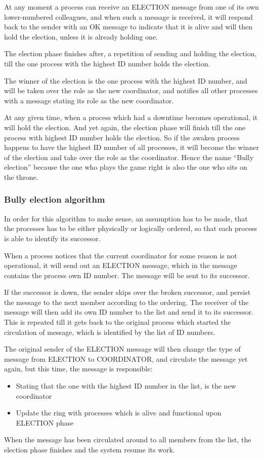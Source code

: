 At any moment a process can receive an ELECTION message from one of its own lower-numbered colleagues, and when such a message is received, it will respond back to the sender with an OK message to indicate that it is alive and will then hold the election, unless it is already holding one.

The election phase finishes after, a repetition of sending and holding the election, till the one process with the highest ID number holds the election.

The winner of the election is the one process with the highest ID number, and will be taken over the role as the new coordinator, and notifies all other processes with a message stating its role as the new coordinator. 

At any given time, when a process which had a downtime becomes operational, it will hold the election.
And yet again, the election phase will finish till the one process with highest ID number holds the election. So if the awaken process happens to have the highest ID number of all processes, it will become the winner of the election and take over the role as the coordinator. Hence the name “Bully election” because the one who plays the game right is also the one who sits on the throne.

\subsubsection{Bully election algorithm}
In order for this algorithm to make sense, an assumption has to be made, that the processes has to be either physically or logically ordered, so that each process is able to identify its successor.

When a process notices that the current coordinator for some reason is not operational, it will send out an ELECTION message, which in the message contains the process own ID number. The message will be sent to its successor. 

If the successor is down, the sender skips over the broken successor, and persist the message to the next member according to the ordering. The receiver of the message will then add its own ID number to the list and send it to its successor. This is repeated till it gets back to the original process which started the circulation of message, which is identified by the list of ID numbers.

The original sender of the ELECTION message will then change the type of message from ELECTION to COORDINATOR, and circulate the message yet again, but this time, the message is responsible:

\begin{itemize}
  \item Stating that the one with the highest ID number in the list, is the new coordinator
  \item Update the ring with processes which is alive and functional upon ELECTION phase
\end{itemize}

When the message has been circulated around to all members from the list, the election phase finishes and the system resume its work.
